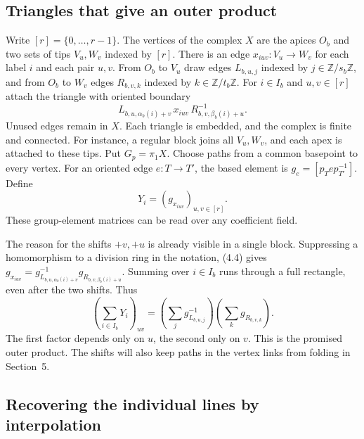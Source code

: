 \documentclass[11pt,a4paper]{article}
\numberwithin{equation}{section}
\begin{document}
\subsection{Triangles that give an outer product}

Write \([r]=\{0,\ldots,r-1\}\). The vertices of the complex \(X\) are the apices \(O_b\) and two sets of tips \(V_u,W_v\) indexed by \([r]\). There is an edge \(x_{iuv}:V_u\to W_v\) for each label \(i\) and each pair \(u,v\). From \(O_b\) to \(V_u\) draw edges \(L_{b,u,j}\) indexed by \(j\in\mathbb Z/s_b\mathbb Z\), and from \(O_b\) to \(W_v\) edges \(R_{b,v,k}\) indexed by \(k\in\mathbb Z/t_b\mathbb Z\). For \(i\in I_b\) and \(u,v\in[r]\) attach the triangle with oriented boundary
\begin{equation}
 L_{b,u,\alpha_b(i)+v}\,x_{iuv}\,R_{b,v,\beta_b(i)+u}^{-1}.
\end{equation}
Unused edges remain in \(X\). Each triangle is embedded, and the complex is finite and connected. For instance, a regular block joins all \(V_u,W_v\), and each apex is attached to these tips. Put \(G_p=\pi_1X\). Choose paths from a common basepoint to every vertex. For an oriented edge \(e:T\to T'\), the based element is \(g_e=[p_Tep_{T'}^{-1}]\). Define
\begin{equation}
 Y_i=(g_{x_{iuv}})_{u,v\in[r]}.
\end{equation}
These group-element matrices can be read over any coefficient field.

The reason for the shifts \(+v,+u\) is already visible in a single block. Suppressing a homomorphism to a division ring in the notation, (4.4) gives \(g_{x_{iuv}}=g_{L_{b,u,\alpha_b(i)+v}}^{-1}g_{R_{b,v,\beta_b(i)+u}}\). Summing over \(i\in I_b\) runs through a full rectangle, even after the two shifts. Thus
\begin{equation}
 \left(\sum_{i\in I_b}Y_i\right)_{uv}
 =\left(\sum_j g_{L_{b,u,j}}^{-1}\right)\left(\sum_k g_{R_{b,v,k}}\right).
\end{equation}
The first factor depends only on \(u\), the second only on \(v\). This is the promised outer product. The shifts will also keep paths in the vertex links from folding in Section~5.

\subsection{Recovering the individual lines by interpolation}
\end{document}
